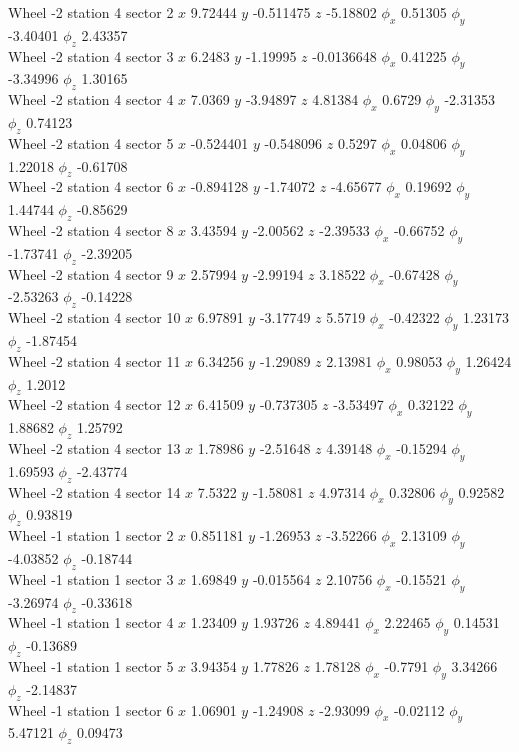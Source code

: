 \documentclass[compress]{beamer}
\begin{document}
\begin{frame}
Wheel -2 station 4 sector 2 $x$ 9.72444 $y$ -0.511475 $z$ -5.18802 $\phi_x$ 0.51305 $\phi_y$ -3.40401 $\phi_z$ 2.43357 \\
Wheel -2 station 4 sector 3 $x$ 6.2483 $y$ -1.19995 $z$ -0.0136648 $\phi_x$ 0.41225 $\phi_y$ -3.34996 $\phi_z$ 1.30165 \\
Wheel -2 station 4 sector 4 $x$ 7.0369 $y$ -3.94897 $z$ 4.81384 $\phi_x$ 0.6729 $\phi_y$ -2.31353 $\phi_z$ 0.74123 \\
Wheel -2 station 4 sector 5 $x$ -0.524401 $y$ -0.548096 $z$ 0.5297 $\phi_x$ 0.04806 $\phi_y$ 1.22018 $\phi_z$ -0.61708 \\
Wheel -2 station 4 sector 6 $x$ -0.894128 $y$ -1.74072 $z$ -4.65677 $\phi_x$ 0.19692 $\phi_y$ 1.44744 $\phi_z$ -0.85629 \\
Wheel -2 station 4 sector 8 $x$ 3.43594 $y$ -2.00562 $z$ -2.39533 $\phi_x$ -0.66752 $\phi_y$ -1.73741 $\phi_z$ -2.39205 \\
Wheel -2 station 4 sector 9 $x$ 2.57994 $y$ -2.99194 $z$ 3.18522 $\phi_x$ -0.67428 $\phi_y$ -2.53263 $\phi_z$ -0.14228 \\
Wheel -2 station 4 sector 10 $x$ 6.97891 $y$ -3.17749 $z$ 5.5719 $\phi_x$ -0.42322 $\phi_y$ 1.23173 $\phi_z$ -1.87454 \\
Wheel -2 station 4 sector 11 $x$ 6.34256 $y$ -1.29089 $z$ 2.13981 $\phi_x$ 0.98053 $\phi_y$ 1.26424 $\phi_z$ 1.2012 \\
Wheel -2 station 4 sector 12 $x$ 6.41509 $y$ -0.737305 $z$ -3.53497 $\phi_x$ 0.32122 $\phi_y$ 1.88682 $\phi_z$ 1.25792 \\
Wheel -2 station 4 sector 13 $x$ 1.78986 $y$ -2.51648 $z$ 4.39148 $\phi_x$ -0.15294 $\phi_y$ 1.69593 $\phi_z$ -2.43774 \\
Wheel -2 station 4 sector 14 $x$ 7.5322 $y$ -1.58081 $z$ 4.97314 $\phi_x$ 0.32806 $\phi_y$ 0.92582 $\phi_z$ 0.93819 \\
Wheel -1 station 1 sector 2 $x$ 0.851181 $y$ -1.26953 $z$ -3.52266 $\phi_x$ 2.13109 $\phi_y$ -4.03852 $\phi_z$ -0.18744 \\
Wheel -1 station 1 sector 3 $x$ 1.69849 $y$ -0.015564 $z$ 2.10756 $\phi_x$ -0.15521 $\phi_y$ -3.26974 $\phi_z$ -0.33618 \\
Wheel -1 station 1 sector 4 $x$ 1.23409 $y$ 1.93726 $z$ 4.89441 $\phi_x$ 2.22465 $\phi_y$ 0.14531 $\phi_z$ -0.13689 \\
Wheel -1 station 1 sector 5 $x$ 3.94354 $y$ 1.77826 $z$ 1.78128 $\phi_x$ -0.7791 $\phi_y$ 3.34266 $\phi_z$ -2.14837 \\
Wheel -1 station 1 sector 6 $x$ 1.06901 $y$ -1.24908 $z$ -2.93099 $\phi_x$ -0.02112 $\phi_y$ 5.47121 $\phi_z$ 0.09473 \\

\end{frame}
\end{document}
